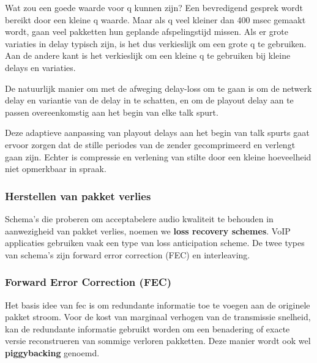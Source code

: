 \noindent Wat zou een goede waarde voor q kunnen zijn? Een bevredigend gesprek wordt bereikt door een kleine q waarde. Maar als q veel kleiner dan 400 msec gemaakt wordt, gaan veel pakketten hun geplande afspelingstijd missen. Als er grote variaties in delay typisch zijn, is het dus verkieslijk om een grote q te gebruiken. Aan de andere kant is het verkieslijk om een kleine q te gebruiken bij kleine delays en variaties.


De natuurlijk manier om met de afweging delay-loss om te gaan is om de netwerk delay en variantie van de delay in te schatten, en om de playout delay aan te passen overeenkomstig aan het begin van elke talk spurt. 

\noindent Deze adaptieve aanpassing van playout delays aan het begin van talk spurts gaat ervoor zorgen dat de stille periodes van de zender gecomprimeerd en verlengt gaan zijn. Echter is compressie en verlening van stilte door een kleine hoeveelheid niet opmerkbaar in spraak.

\subsubsection{Herstellen van pakket verlies}

\noindent Schema’s die proberen om acceptabelere audio kwaliteit te behouden in aanwezigheid van pakket verlies, noemen we \textbf{loss recovery schemes}. VoIP applicaties gebruiken vaak een type van loss anticipation scheme. De twee types van schema’s zijn forward error correction (FEC) en interleaving.

\newpage

\subsubsection{Forward Error Correction (FEC)}

\noindent Het basis idee van \acrshort{fec} is om redundante informatie toe te voegen aan de originele pakket stroom. Voor de kost van marginaal verhogen van de transmissie snelheid, kan de redundante informatie gebruikt worden om een benadering of exacte versie reconstrueren van sommige verloren pakketten. Deze manier wordt ook wel \textbf{piggybacking} genoemd.

